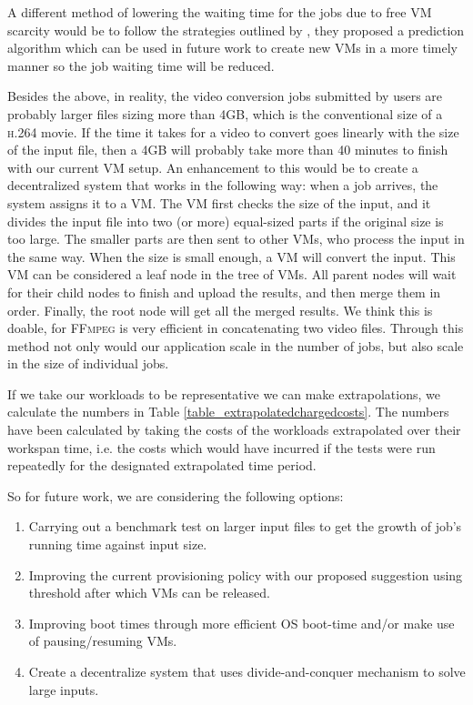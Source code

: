 A different method of lowering the waiting time for the jobs due to
free VM scarcity would be to follow the strategies outlined
by \cite{Shen:2011:CER:2038916.2038921}, they proposed a prediction
algorithm which can be used in future work to create new VMs in a more
timely manner so the job waiting time will be reduced.

Besides the above, in reality, the video conversion jobs submitted by
users are probably larger files sizing more than 4GB, which is the
conventional size of a \textsc{h.264} movie. If the time it takes for
a video to convert goes linearly with the size of the input file, then
a 4GB will probably take more than 40 minutes to finish with our
current VM setup. An enhancement to this would be to create a
decentralized system that works in the following way: when a job
arrives, the system assigns it to a VM. The VM first checks the size
of the input, and it divides the input file into two (or more)
equal-sized parts if the original size is too large.  The smaller
parts are then sent to other VMs, who process the input in the same
way. When the size is small enough, a VM will convert the input. This
VM can be considered a leaf node in the tree of VMs. All parent nodes
will wait for their child nodes to finish and upload the results, and
then merge them in order. Finally, the root node will get all the
merged results. We think this is doable, for \textsc{FFmpeg} is very
efficient in concatenating two video files. Through this method not
only would our application scale in the number of jobs, but also scale
in the size of individual jobs.

If we take our workloads to be representative we can make
extrapolations, we calculate the numbers in Table
\ref{table_extrapolatedchargedcosts}. The numbers have been calculated by
taking the costs of the workloads extrapolated over their workspan
time, i.e. the costs which would have incurred if the tests were run
repeatedly for the designated extrapolated time period.


So for future work, we are considering the following options:
\begin{enumerate}
\item Carrying out a benchmark test on larger input files to get the
  growth of job's running time against input size.

\item Improving the current provisioning policy with our proposed
  suggestion using threshold after which VMs can be released.
\item Improving boot times through more efficient OS boot-time and/or
  make use of pausing/resuming VMs.

\item Create a decentralize system that uses divide-and-conquer
  mechanism to solve large inputs.

\end{enumerate}



